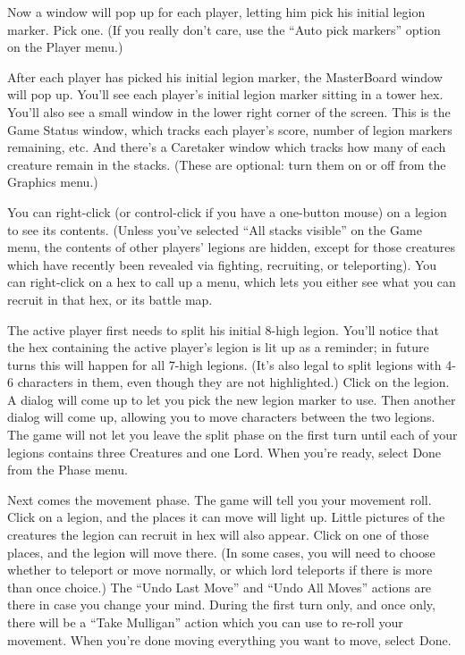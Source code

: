 \documentclass{article}
\begin{document}
Now a window will pop up for each player, letting him pick his initial legion
marker. Pick one. (If you really don't care, use the ``Auto pick markers''
option on the Player menu.)

After each player has picked his initial legion marker, the MasterBoard window
will pop up. You'll see each player's initial legion marker sitting in a
tower hex. You'll also see a small window in the lower right corner of the
screen. This is the Game Status window, which tracks each player's score,
number of legion markers remaining, etc. And there's a Caretaker window which 
tracks how many of each creature remain in the stacks. (These are optional: 
turn them on or off from the Graphics menu.)

You can right-click (or control-click if you have a one-button mouse) on a 
legion to see its contents. (Unless you've selected ``All stacks visible'' on 
the Game menu, the contents of other players' legions are hidden, except for 
those creatures which have recently been revealed via fighting, recruiting, 
or teleporting). You can right-click on a hex to call up a menu, which lets 
you either see what you can recruit in that hex, or its battle map.

The active player first needs to split his initial 8-high legion. You'll
notice that the hex containing the active player's legion is lit up as a
reminder; in future turns this will happen for all 7-high legions. (It's
also legal to split legions with 4-6 characters in them, even though they
are not highlighted.) Click on the legion. A dialog will come up to let
you pick the new legion marker to use. Then another dialog will come up,
allowing you to move characters between the two legions. The game will
not let you leave the split phase on the first turn until each of your
legions contains three Creatures and one Lord. When you're ready, select
Done from the Phase menu.

Next comes the movement phase. The game will tell you your movement roll.
Click on a legion, and the places it can move will light up. Little pictures
of the creatures the legion can recruit in hex will also appear. Click on 
one of those places, and the legion will move there. (In some cases, you 
will need to choose whether to teleport or move normally, or which lord 
teleports if there is more than once choice.) The ``Undo Last Move'' and
``Undo All Moves'' actions are there in case you change your mind. During the
first turn only, and once only, there will be a ``Take Mulligan'' action which
you can use to re-roll your movement. When you're done moving everything you
want to move, select Done.
\end{document}
